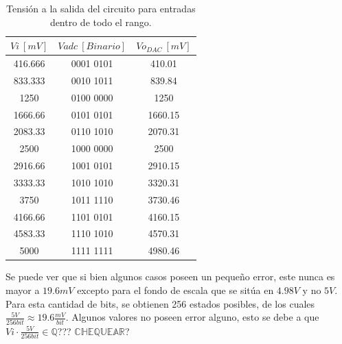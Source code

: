 \begin{table}[H]
\centering
\begin{tabular}{ccc}
\toprule
$Vi \ [mV]$ & $Vadc \ [Binario]$ & $Vo_{DAC} \ [mV]$ \\ \midrule
416.666 & 0001 0101 & 410.01 \\
833.333 & 0010 1011 & 839.84 \\
1250 & 0100 0000 & 1250 \\
1666.66 & 0101 0101 & 1660.15 \\
2083.33 & 0110 1010 & 2070.31 \\
2500 & 1000 0000 & 2500 \\
2916.66 & 1001 0101 & 2910.15 \\
3333.33 & 1010 1010 & 3320.31 \\
3750 & 1011 1110 & 3730.46 \\
4166.66 & 1101 0101 & 4160.15 \\
4583.33 & 1110 1010 & 4570.31 \\
5000 & 1111 1111 & 4980.46 \\ \bottomrule
\end{tabular}
\caption{Tensión a la salida del circuito para entradas dentro de todo el rango.}
\end{table}

Se puede ver que si bien algunos casos poseen un pequeño error, este nunca es mayor a $19.6mV$ excepto para el fondo de escala que se sitúa en $4.98V$ y no $5V$. Para esta cantidad de bits, se obtienen 256 estados posibles, de los cuales $\frac{5V}{256bit} \approx 19.6\frac{mV}{bit}$. Algunos valores no poseen error alguno, esto se debe a que $Vi\cdot \frac{5V}{256bit} \in \mathbb{Q}$??? $\mathbb{CHEQUEAR}$? 

